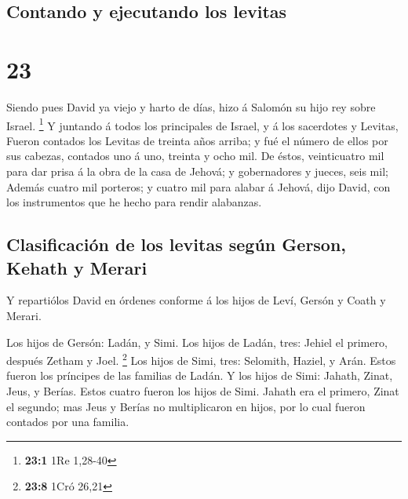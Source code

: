 \hypertarget{contando-y-ejecutando-los-levitas}{%
\subsection{Contando y ejecutando los
levitas}\label{contando-y-ejecutando-los-levitas}}

\hypertarget{section-22}{%
\section{23}\label{section-22}}

 Siendo pues David ya viejo y harto de días, hizo á Salomón
su hijo rey sobre Israel. \footnote{\textbf{23:1} 1Re 1,28-40}
 Y juntando á todos los principales de Israel, y á los
sacerdotes y Levitas,  Fueron contados los Levitas de
treinta años arriba; y fué el número de ellos por sus cabezas, contados
uno á uno, treinta y ocho mil.  De éstos, veinticuatro mil
para dar prisa á la obra de la casa de Jehová; y gobernadores y jueces,
seis mil;  Además cuatro mil porteros; y cuatro mil para
alabar á Jehová, dijo David, con los instrumentos que he hecho para
rendir alabanzas.

\hypertarget{clasificaciuxf3n-de-los-levitas-seguxfan-gerson-kehath-y-merari}{%
\subsection{Clasificación de los levitas según Gerson, Kehath y
Merari}\label{clasificaciuxf3n-de-los-levitas-seguxfan-gerson-kehath-y-merari}}

 Y repartiólos David en órdenes conforme á los hijos de
Leví, Gersón y Coath y Merari.

 Los hijos de Gersón: Ladán, y Simi.  Los hijos
de Ladán, tres: Jehiel el primero, después Zetham y Joel. \footnote{\textbf{23:8}
  1Cró 26,21}  Los hijos de Simi, tres: Selomith, Haziel, y
Arán. Estos fueron los príncipes de las familias de Ladán. 
Y los hijos de Simi: Jahath, Zinat, Jeus, y Berías. Estos cuatro fueron
los hijos de Simi.  Jahath era el primero, Zinat el
segundo; mas Jeus y Berías no multiplicaron en hijos, por lo cual fueron
contados por una familia.

